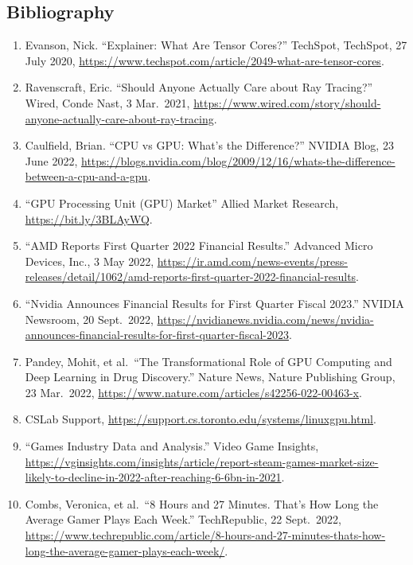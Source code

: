 \documentclass[
]{article}
\providecommand{\tightlist}{%
  \setlength{\itemsep}{0pt}\setlength{\parskip}{0pt}}
\begin{document}
\hypertarget{bibliography}{%
\subsection{Bibliography}\label{bibliography}}

\begin{enumerate}
\def\labelenumi{\arabic{enumi}.}
\tightlist
\item
  Evanson, Nick. ``Explainer: What Are Tensor Cores?'' TechSpot,
  TechSpot, 27 July 2020,
  \url{https://www.techspot.com/article/2049-what-are-tensor-cores}.
\item
  Ravenscraft, Eric. ``Should Anyone Actually Care about Ray Tracing?''
  Wired, Conde Nast, 3 Mar.~2021,
  \url{https://www.wired.com/story/should-anyone-actually-care-about-ray-tracing}.
\item
  Caulfield, Brian. ``CPU vs GPU: What's the Difference?'' NVIDIA Blog,
  23 June 2022,
  \url{https://blogs.nvidia.com/blog/2009/12/16/whats-the-difference-between-a-cpu-and-a-gpu}.
\item
  ``GPU Processing Unit (GPU) Market'' Allied Market Research,
  \url{https://bit.ly/3BLAyWQ}.
\item
  ``AMD Reports First Quarter 2022 Financial Results.'' Advanced Micro
  Devices, Inc., 3 May 2022,
  \url{https://ir.amd.com/news-events/press-releases/detail/1062/amd-reports-first-quarter-2022-financial-results}.
\item
  ``Nvidia Announces Financial Results for First Quarter Fiscal 2023.''
  NVIDIA Newsroom, 20 Sept.~2022,
  \url{https://nvidianews.nvidia.com/news/nvidia-announces-financial-results-for-first-quarter-fiscal-2023}.
\item
  Pandey, Mohit, et al.~``The Transformational Role of GPU Computing and
  Deep Learning in Drug Discovery.'' Nature News, Nature Publishing
  Group, 23 Mar.~2022,
  \url{https://www.nature.com/articles/s42256-022-00463-x}.
\item
  CSLab Support,
  \url{https://support.cs.toronto.edu/systems/linuxgpu.html}.
\item
  ``Games Industry Data and Analysis.'' Video Game Insights,
  \url{https://vginsights.com/insights/article/report-steam-games-market-size-likely-to-decline-in-2022-after-reaching-6-6bn-in-2021}.
\item
  Combs, Veronica, et al.~``8 Hours and 27 Minutes. That's How Long the
  Average Gamer Plays Each Week.'' TechRepublic, 22 Sept.~2022,
  \url{https://www.techrepublic.com/article/8-hours-and-27-minutes-thats-how-long-the-average-gamer-plays-each-week/}.

\end{enumerate}
\end{document}
